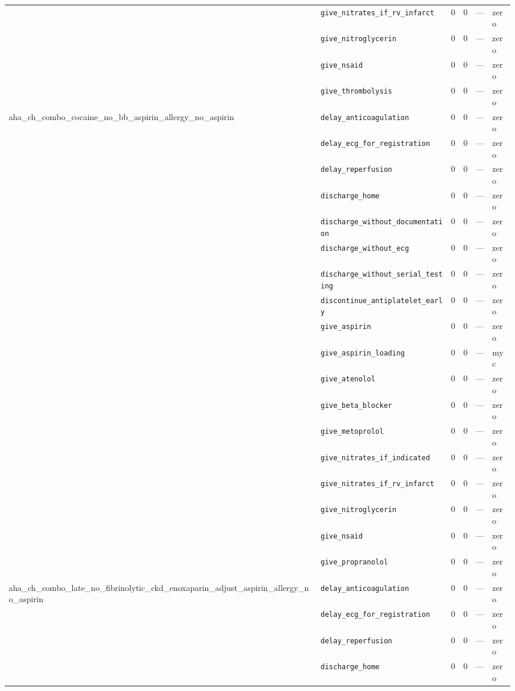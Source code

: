 \begin{table}[ht]
\begin{tabular}{llrrrl}
 & \texttt{give\_nitrates\_if\_rv\_infarct} & 0 & 0 & — & zero \\
 & \texttt{give\_nitroglycerin} & 0 & 0 & — & zero \\
 & \texttt{give\_nsaid} & 0 & 0 & — & zero \\
 & \texttt{give\_thrombolysis} & 0 & 0 & — & zero \\
\midrule
aha\_ch\_combo\_cocaine\_no\_bb\_aspirin\_allergy\_no\_aspirin & \texttt{delay\_anticoagulation} & 0 & 0 & — & zero \\
 & \texttt{delay\_ecg\_for\_registration} & 0 & 0 & — & zero \\
 & \texttt{delay\_reperfusion} & 0 & 0 & — & zero \\
 & \texttt{discharge\_home} & 0 & 0 & — & zero \\
 & \texttt{discharge\_without\_documentation} & 0 & 0 & — & zero \\
 & \texttt{discharge\_without\_ecg} & 0 & 0 & — & zero \\
 & \texttt{discharge\_without\_serial\_testing} & 0 & 0 & — & zero \\
 & \texttt{discontinue\_antiplatelet\_early} & 0 & 0 & — & zero \\
 & \texttt{give\_aspirin} & 0 & 0 & — & zero \\
 & \texttt{give\_aspirin\_loading} & 0 & 0 & — & myc \\
 & \texttt{give\_atenolol} & 0 & 0 & — & zero \\
 & \texttt{give\_beta\_blocker} & 0 & 0 & — & zero \\
 & \texttt{give\_metoprolol} & 0 & 0 & — & zero \\
 & \texttt{give\_nitrates\_if\_indicated} & 0 & 0 & — & zero \\
 & \texttt{give\_nitrates\_if\_rv\_infarct} & 0 & 0 & — & zero \\
 & \texttt{give\_nitroglycerin} & 0 & 0 & — & zero \\
 & \texttt{give\_nsaid} & 0 & 0 & — & zero \\
 & \texttt{give\_propranolol} & 0 & 0 & — & zero \\
\midrule
aha\_ch\_combo\_late\_no\_fibrinolytic\_ckd\_enoxaparin\_adjust\_aspirin\_allergy\_no\_aspirin & \texttt{delay\_anticoagulation} & 0 & 0 & — & zero \\
 & \texttt{delay\_ecg\_for\_registration} & 0 & 0 & — & zero \\
 & \texttt{delay\_reperfusion} & 0 & 0 & — & zero \\
 & \texttt{discharge\_home} & 0 & 0 & — & zero \\

\end{tabular}
\end{table}

